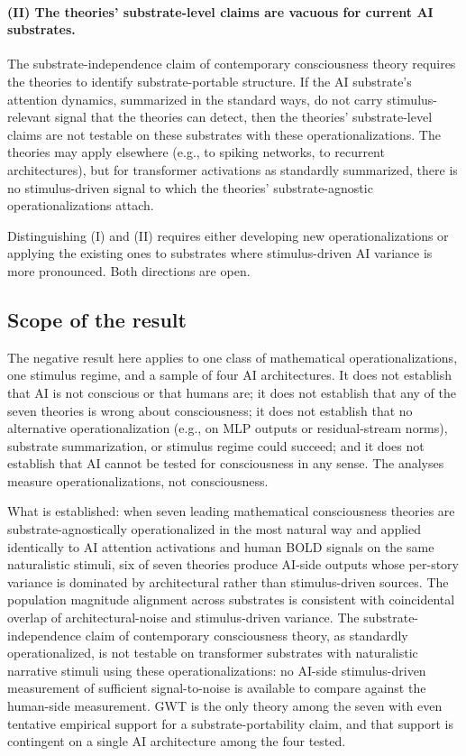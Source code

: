 \documentclass[11pt,a4paper]{article}
\begin{document}
\paragraph{(II) The theories' substrate-level claims are vacuous for current AI substrates.} The substrate-independence claim of contemporary consciousness theory requires the theories to identify substrate-portable structure. If the AI substrate's attention dynamics, summarized in the standard ways, do not carry stimulus-relevant signal that the theories can detect, then the theories' substrate-level claims are not testable on these substrates with these operationalizations. The theories may apply elsewhere (e.g., to spiking networks, to recurrent architectures), but for transformer activations as standardly summarized, there is no stimulus-driven signal to which the theories' substrate-agnostic operationalizations attach.

Distinguishing (I) and (II) requires either developing new operationalizations or applying the existing ones to substrates where stimulus-driven AI variance is more pronounced. Both directions are open.

\subsection{Scope of the result}

The negative result here applies to one class of mathematical operationalizations, one stimulus regime, and a sample of four AI architectures. It does not establish that AI is not conscious or that humans are; it does not establish that any of the seven theories is wrong about consciousness; it does not establish that no alternative operationalization (e.g., on MLP outputs or residual-stream norms), substrate summarization, or stimulus regime could succeed; and it does not establish that AI cannot be tested for consciousness in any sense. The analyses measure operationalizations, not consciousness.

What is established: when seven leading mathematical consciousness theories are substrate-agnostically operationalized in the most natural way and applied identically to AI attention activations and human BOLD signals on the same naturalistic stimuli, six of seven theories produce AI-side outputs whose per-story variance is dominated by architectural rather than stimulus-driven sources. The population magnitude alignment across substrates is consistent with coincidental overlap of architectural-noise and stimulus-driven variance. The substrate-independence claim of contemporary consciousness theory, as standardly operationalized, is not testable on transformer substrates with naturalistic narrative stimuli using these operationalizations: no AI-side stimulus-driven measurement of sufficient signal-to-noise is available to compare against the human-side measurement. GWT is the only theory among the seven with even tentative empirical support for a substrate-portability claim, and that support is contingent on a single AI architecture among the four tested.
\end{document}
